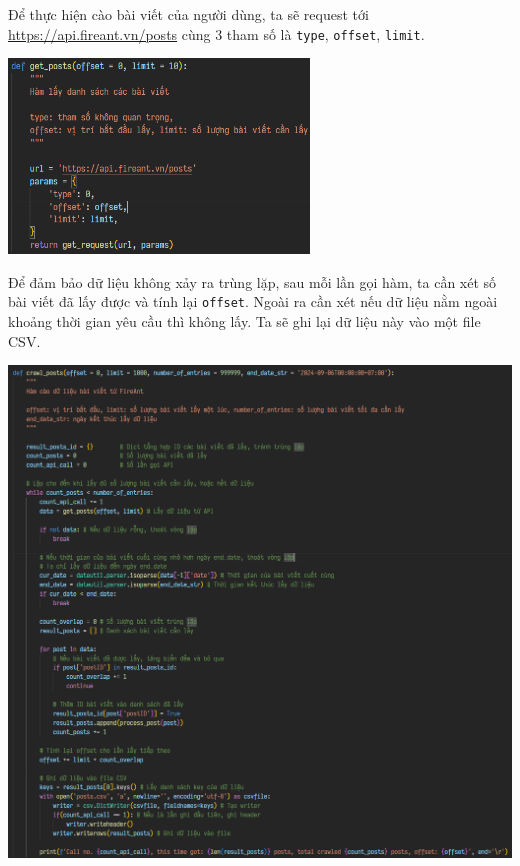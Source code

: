 Để thực hiện cào bài viết của người dùng, ta sẽ request tới \href{https://api.fireant.vn/posts}{https://api.fireant.vn/posts} cùng 3 tham số là \texttt{type}, \texttt{offset}, \texttt{limit}.

\begin{center}
\includegraphics[width=0.6\textwidth]{images/code-1.3-getposts.png}
\end{center}

Để đảm bảo dữ liệu không xảy ra trùng lặp, sau mỗi lần gọi hàm, ta cần xét số bài viết đã lấy được và tính lại \texttt{offset}. Ngoài ra cần xét nếu dữ liệu nằm ngoài khoảng thời gian yêu cầu thì không lấy. Ta sẽ ghi lại dữ liệu này vào một file CSV.

\begin{center}
    \centering
    \includegraphics[width=1\linewidth]{images/code-1.4-crawlpost.png}
\end{center}

